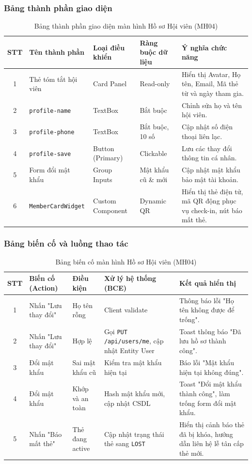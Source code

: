 \documentclass[12pt,a4paper]{report}
\begin{document}
\subsubsection{Bảng thành phần giao diện}
\begin{table}[H]
\centering
\small
\begin{tabularx}{\textwidth}{|c|l|l|l|X|}
\hline
\textbf{STT} & \textbf{Tên thành phần} & \textbf{Loại điều khiển} & \textbf{Ràng buộc dữ liệu} & \textbf{Ý nghĩa chức năng} \\ \hline
1 & Thẻ tóm tắt hội viên & Card Panel & Read-only & Hiển thị Avatar, Họ tên, Email, Mã thẻ từ và ngày tham gia. \\ \hline
2 & \texttt{profile-name} & TextBox & Bắt buộc & Chỉnh sửa họ và tên hội viên. \\ \hline
3 & \texttt{profile-phone} & TextBox & Bắt buộc, 10 số & Cập nhật số điện thoại liên lạc. \\ \hline
4 & \texttt{profile-save} & Button (Primary) & Clickable & Lưu các thay đổi thông tin cá nhân. \\ \hline
5 & Form đổi mật khẩu & Group Inputs & Mật khẩu cũ \& mới & Cập nhật mật khẩu bảo mật tài khoản. \\ \hline
6 & \texttt{MemberCardWidget} & Custom Component & Dynamic QR & Hiển thị thẻ điện tử, mã QR động phục vụ check-in, nút báo mất thẻ. \\ \hline
\end{tabularx}
\caption{Bảng thành phần giao diện màn hình Hồ sơ Hội viên (MH04)}
\end{table}

\subsubsection{Bảng biến cố và luồng thao tác}
\begin{table}[H]
\centering
\small
\begin{tabularx}{\textwidth}{|c|l|l|X|X|}
\hline
\textbf{STT} & \textbf{Biến cố (Action)} & \textbf{Điều kiện} & \textbf{Xử lý hệ thống (BCE)} & \textbf{Kết quả hiển thị} \\ \hline
1 & Nhấn "Lưu thay đổi" & Họ tên rỗng & Client validate & Thông báo lỗi "Họ tên không được để trống". \\ \hline
2 & Nhấn "Lưu thay đổi" & Hợp lệ & Gọi \texttt{PUT /api/users/me}, cập nhật Entity User & Toast thông báo "Đã lưu hồ sơ thành công". \\ \hline
3 & Đổi mật khẩu & Sai mật khẩu cũ & Kiểm tra mật khẩu hiện tại & Báo lỗi "Mật khẩu hiện tại không đúng". \\ \hline
4 & Đổi mật khẩu & Khớp và an toàn & Hash mật khẩu mới, cập nhật CSDL & Toast "Đổi mật khẩu thành công", làm trống form đổi mật khẩu. \\ \hline
5 & Nhấn "Báo mất thẻ" & Thẻ đang active & Cập nhật trạng thái thẻ sang \texttt{LOST} & Hiển thị cảnh báo thẻ đã bị khóa, hướng dẫn liên hệ lễ tân cấp thẻ mới. \\ \hline
\end{tabularx}
\caption{Bảng biến cố màn hình Hồ sơ Hội viên (MH04)}
\end{table}
\end{document}
